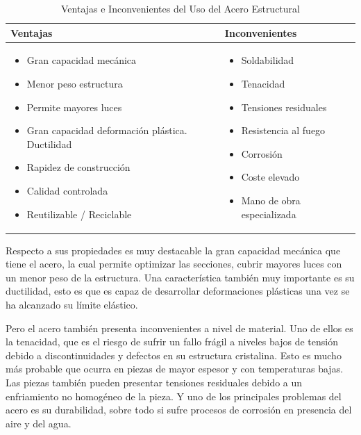 \begin{table}
    \centering
    \caption{Ventajas e Inconvenientes del Uso del Acero Estructural}
    \label{tab: Ventajas y Desventajas del Acero Estructural}

    \begin{tabularx}{\columnwidth}{|>{\raggedright\arraybackslash}X|>{\raggedright\arraybackslash}X|}
    \hline
    \textbf{Ventajas} & \textbf{Inconvenientes} \\
    \hline

    \begin{itemize}
        \item Gran capacidad mecánica
        \item Menor peso estructura
        \item Permite mayores luces
        \item Gran capacidad deformación plástica. Ductilidad
        \item Rapidez de construcción
        \item Calidad controlada
        \item Reutilizable / Reciclable
    \end{itemize}

    &

    \begin{itemize}
        \item Soldabilidad
        \item Tenacidad
        \item Tensiones residuales
        \item Resistencia al fuego
        \item Corrosión
        \item Coste elevado
        \item Mano de obra especializada
    \end{itemize} \\
    \hline
    \end{tabularx}
\end{table}

Respecto a sus propiedades es muy destacable la gran capacidad mecánica que tiene el acero, la cual permite optimizar las secciones, cubrir mayores luces con un menor peso de la estructura. Una característica también muy importante es su ductilidad, esto es que es capaz de desarrollar deformaciones plásticas una vez se ha alcanzado su límite elástico.

Pero el acero también presenta inconvenientes a nivel de material. Uno de ellos es la tenacidad, que es el riesgo de sufrir un fallo frágil a niveles bajos de tensión debido a discontinuidades y defectos en su estructura cristalina. Esto es mucho más probable que ocurra en piezas de mayor espesor y con temperaturas bajas. Las piezas también pueden presentar tensiones residuales debido a un enfriamiento no homogéneo de la pieza. Y uno de los principales problemas del acero es su durabilidad, sobre todo si sufre procesos de corrosión en presencia del aire y del agua.

